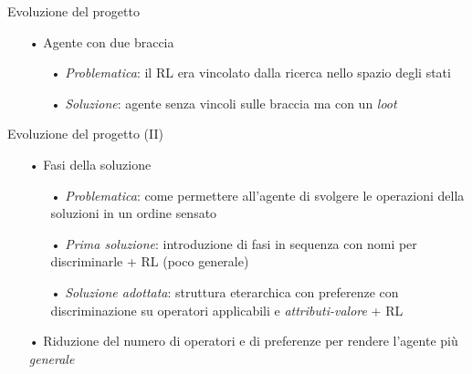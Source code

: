 \documentclass{beamer}
\begin{document}
    \begin{frame}{Evoluzione del progetto}
        \begin{itemize}
            \item[•] Agente con due braccia
                \begin{itemize}
                    \item[•] \textit{Problematica}: il RL era vincolato dalla ricerca nello spazio degli stati
                    \item[•] \textit{Soluzione}: agente senza vincoli sulle braccia ma con un \textit{loot}
                \end{itemize}
        \end{itemize}
    \end{frame}

    \begin{frame}{Evoluzione del progetto (II)}
        \begin{itemize}
            \item[•] Fasi della soluzione
                \begin{itemize}
                    \item[•] \textit{Problematica}: come permettere all'agente di svolgere le operazioni della soluzioni in un ordine sensato
                    \item[•] \textit{Prima soluzione}: introduzione di fasi in sequenza con nomi per discriminarle + RL (poco generale)
                    \item[•] \textit{Soluzione adottata}: struttura eterarchica con preferenze con discriminazione su operatori applicabili e \textit{attributi-valore} + RL
                \end{itemize}
            \item[•] Riduzione del numero di operatori e di preferenze per rendere l'agente più \textit{generale}
        \end{itemize}
    \end{frame}
\end{document}
